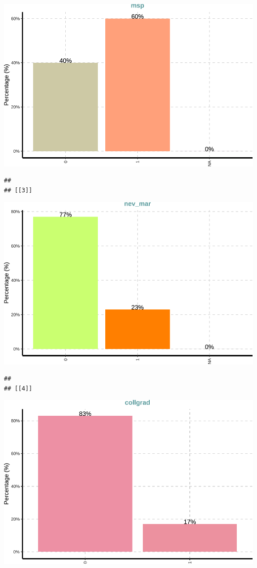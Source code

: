 \documentclass[
]{article}
\begin{document}
\includegraphics{notebook_panel_data_files/figure-latex/Exploratory data analysis-2.pdf}

\begin{verbatim}
## 
## [[3]]
\end{verbatim}

\includegraphics{notebook_panel_data_files/figure-latex/Exploratory data analysis-3.pdf}

\begin{verbatim}
## 
## [[4]]
\end{verbatim}

\includegraphics{notebook_panel_data_files/figure-latex/Exploratory data analysis-4.pdf}
\end{document}
